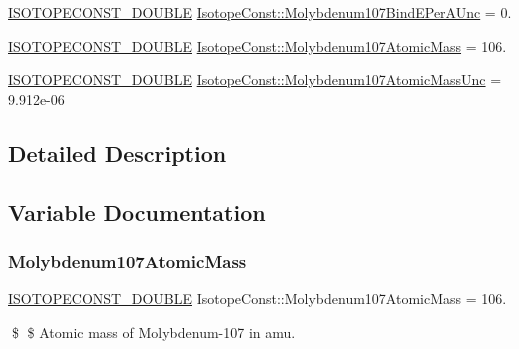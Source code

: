 \begin{DoxyCompactItemize}
\mbox{\hyperlink{group___isotope_const-_macros_ga8f45a7272ce02c0b4c65c44636ed719a}{I\+S\+O\+T\+O\+P\+E\+C\+O\+N\+S\+T\+\_\+\+D\+O\+U\+B\+LE}} \mbox{\hyperlink{group___isotope_const-_molybdenum-_mo107_gaf11a64239c2cab4e0e274eca1c20a8fe}{Isotope\+Const\+::\+Molybdenum107\+Bind\+E\+Per\+A\+Unc}} = 0.
\item 
\mbox{\hyperlink{group___isotope_const-_macros_ga8f45a7272ce02c0b4c65c44636ed719a}{I\+S\+O\+T\+O\+P\+E\+C\+O\+N\+S\+T\+\_\+\+D\+O\+U\+B\+LE}} \mbox{\hyperlink{group___isotope_const-_molybdenum-_mo107_gaf5521e5a59c8fbb9d7220e5f0aff0f5d}{Isotope\+Const\+::\+Molybdenum107\+Atomic\+Mass}} = 106.
\item 
\mbox{\hyperlink{group___isotope_const-_macros_ga8f45a7272ce02c0b4c65c44636ed719a}{I\+S\+O\+T\+O\+P\+E\+C\+O\+N\+S\+T\+\_\+\+D\+O\+U\+B\+LE}} \mbox{\hyperlink{group___isotope_const-_molybdenum-_mo107_ga2374f20f45ed35888080ec285698feca}{Isotope\+Const\+::\+Molybdenum107\+Atomic\+Mass\+Unc}} = 9.\+912e-\/06
\end{DoxyCompactItemize}


\subsection{Detailed Description}


\subsection{Variable Documentation}
\mbox{\label{group___isotope_const-_molybdenum-_mo107_gaf5521e5a59c8fbb9d7220e5f0aff0f5d}} 
\subsubsection{\texorpdfstring{Molybdenum107\+Atomic\+Mass}{Molybdenum107AtomicMass}}
{\footnotesize\ttfamily \mbox{\hyperlink{group___isotope_const-_macros_ga8f45a7272ce02c0b4c65c44636ed719a}{I\+S\+O\+T\+O\+P\+E\+C\+O\+N\+S\+T\+\_\+\+D\+O\+U\+B\+LE}} Isotope\+Const\+::\+Molybdenum107\+Atomic\+Mass = 106.}

\$ \$ Atomic mass of Molybdenum-\/107 in amu. \mbox{\label{group___isotope_const-_molybdenum-_mo107_ga2374f20f45ed35888080ec285698feca}} 
